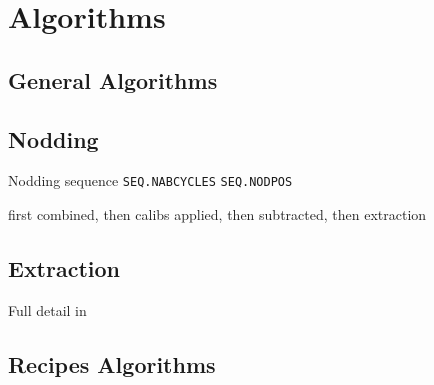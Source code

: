 \section{Algorithms}
\label{sec:algorithms}


\subsection{General Algorithms}
\label{sec:algorithms-general}

\subsection{Nodding}
\label{sec:nodd}

Nodding sequence \texttt{SEQ.NABCYCLES}
\texttt{SEQ.NODPOS}

first combined, then calibs applied, then subtracted, then extraction

\subsection{Extraction}
\label{sec:extract}

Full detail in
\cite{2021A&A...646A..32P}

\subsection{Recipes Algorithms} 
\label{sec:algorithms-recipes}
